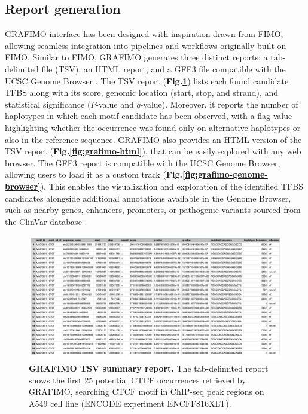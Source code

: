 \documentclass[a4paper, titlepage, openright]{book}
\newcommand{\grafimo}{GRAFIMO\xspace}
\begin{document}
\subsection{Report generation}
\grafimo interface has been designed with inspiration drawn from FIMO, allowing seamless integration into pipelines and workflows originally built on FIMO. Similar to FIMO, \grafimo generates three distinct reports: a tab-delimited file (TSV), an HTML report, and a GFF3 file compatible with the UCSC Genome Browser \citep{lee2020ucsc}. The TSV report (\textbf{Fig.\ref{fig:grafimo-tsv}}) lists each found candidate TFBS along with its score, genomic location (start, stop, and strand), and statistical significance ($P$-value and $q$-value). Moreover, it reports the number of haplotypes in which each motif candidate has been observed, with a flag value highlighting whether the occurrence was found only on alternative haplotypes or also in the reference sequence. \grafimo also provides an HTML version of the TSV report (\textbf{Fig.\ref{fig:grafimo-html}}), that can be easily explored with any web browser. The GFF3 report is compatible with the UCSC Genome Browser, allowing users to load it as a custom track (\textbf{Fig.\ref{fig:grafimo-genome-browser}}). This enables the visualization and exploration of the identified TFBS candidates alongside additional annotations available in the Genome Browser, such as nearby genes, enhancers, promoters, or pathogenic variants sourced from the ClinVar database \citep{landrum2020clinvar}.

\begin{figure}
    \centering
    \includegraphics[width=\textwidth]{figures/grafimo-tsv-report.png}
    \caption[\grafimo TSV summary report]{\textbf{\grafimo TSV summary report.} The tab-delimited report shows the first 25 potential CTCF occurrences retrieved by \grafimo, searching CTCF motif in ChIP-seq peak regions on A549 cell line (ENCODE experiment ENCFF816XLT).}
    \label{fig:grafimo-tsv}
\end{figure}
\end{document}
